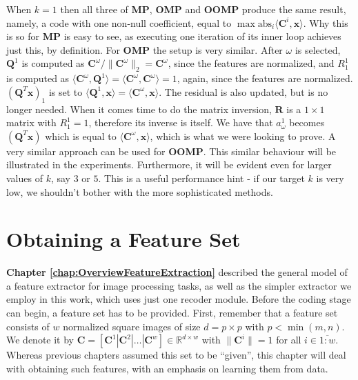 \documentclass[12pt,a4paper,oneside,english]{UPBThesis}
\newcommand{\hctimes}[2]{{#1}\!\times\!{#2}}
\newcommand{\hcrange}[2]{\overline{{#1}\colon\!\!{#2}}}
\begin{document}
When $k=1$ then all three of \textbf{MP}, \textbf{OMP} and \textbf{OOMP} produce the same result, namely, a code with one non-null coefficient, equal to $\max\mbox{abs}_i {\langle \textbf{C}^i, \textbf{x} \rangle }$. Why this is so for \textbf{MP} is easy to see, as executing one iteration of its inner loop achieves just this, by definition. For \textbf{OMP} the setup is very similar. After $\omega$ is selected, $\textbf{Q}^1$ is computed as $\textbf{C}^\omega / \| \textbf{C}^\omega \|_2 = \textbf{C}^\omega$, since the features are normalized, and $R_1^1$ is computed as $\langle \textbf{C}^\omega, \textbf{Q}^1 \rangle = \langle \textbf{C}^\omega, \textbf{C}^\omega \rangle = 1$, again, since the features are normalized. $(\textbf{Q}^T\textbf{x})_1$ is set to $\langle \textbf{Q}^1, \textbf{x} \rangle = \langle \textbf{C}^\omega, \textbf{x} \rangle$. The residual is also updated, but is no longer needed. When it comes time to do the matrix inversion, $\textbf{R}$ is a $\hctimes{1}{1}$ matrix with $R_1^1 = 1$, therefore its inverse is itself. We have that $a_\omega^1$ becomes $(\textbf{Q}^T\textbf{x})$ which is equal to $\langle \textbf{C}^\omega, \textbf{x} \rangle$, which is what we were looking to prove. A very similar approach can be used for \textbf{OOMP}. This similar behaviour will be illustrated in the experiments. Furthermore, it will be evident even for larger values of $k$, say $3$ or $5$. This is a useful performance hint - if our target $k$ is very low, we shouldn't bother with the more sophisticated methods.

\clearpage
\newpage
\thispagestyle{empty}
\mbox{}

\chapter{Obtaining a Feature Set}
\label{chap:ObtainingFeatureSet}

\textbf{Chapter \ref{chap:OverviewFeatureExtraction}} described the general model of a feature extractor for image processing tasks, as well as the simpler extractor we employ in this work, which uses just one recoder module. Before the coding stage can begin, a feature set has to be provided. First, remember that a feature set consists of $w$ normalized square images of size $d = \hctimes{p}{p}$ with $p < \min(m,n)$. We denote it by $\textbf{C} = \left[ \textbf{C}^1 \left|\right. \textbf{C}^2 \left|\right. \dots \left|\right. \textbf{C}^w \right] \in \mathbb{R}^{\hctimes{d}{w}}$ with $\|\mathbf{C}^i\| = 1$ for all $i \in \hcrange{1}{w}$. Whereas previous chapters assumed this set to be ``given'', this chapter will deal with obtaining such features, with an emphasis on learning them from data.
\end{document}
